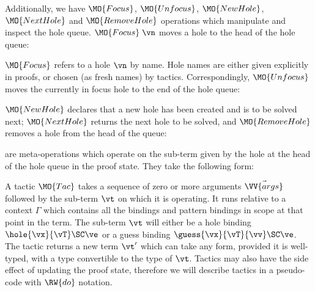 \noindent
Additionally, we have $\MO{Focus}$, $\MO{Unfocus}$, $\MO{NewHole}$,
$\MO{NextHole}$ and $\MO{RemoveHole}$
operations which manipulate and inspect
the hole queue. $\MO{Focus}\;\vn$ moves a hole to the head of the hole queue:


\noindent
$\MO{Focus}$ refers to a hole $\vn$ by name. Hole names are either given
explicitly in proofs, or chosen (as fresh names) by tactics.
Correspondingly, $\MO{Unfocus}$ moves the currently in focus hole to the
end of the hole queue:


\noindent
$\MO{NewHole}$ declares that a new hole has been created and is to be solved
next; $\MO{NextHole}$ returns the next hole to be solved, and $\MO{RemoveHole}$
removes a hole from the head of the queue:


\noindent
{} are meta-operations which operate on the sub-term given by the
hole at the head of the hole queue in the proof state. They take the following
form:


A tactic $\MO{Tac}$ takes a sequence of zero or more arguments
$\vec{\VV{args}}$ followed by the sub-term $\vt$ on which it is operating. It
runs relative to a context $\Gamma$ which contains all the bindings and pattern
bindings in scope at that point in the term. The sub-term $\vt$ will either be
a hole binding $\hole{\vx}{\vT}\SC\ve$ or a guess binding
$\guess{\vx}{\vT}{\vv}\SC\ve$. The tactic returns a new term $\vt'$ which can
take any form, provided it is well-typed, with a type convertible to the type
of $\vt$.  Tactics may also have the side effect of updating the proof state,
therefore we will describe tactics in a pseudo-code with $\RW{do}$ notation.

